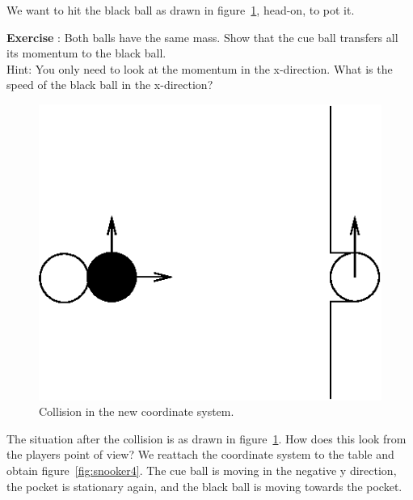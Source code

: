 \documentclass[12pt,a4paper]{article}
\numberwithin{equation}{section}
\numberwithin{figure}{section}
\newcounter{Exercise}
\numberwithin{table}{section}
\begin{document}
We want to hit the black ball as drawn in figure~\ref{fig:snooker3}, head-on, to pot it. 
\begin{shaded}
\textbf{Exercise \theExercise {}} : Both balls have the same mass. Show that the cue ball transfers all its momentum to the black ball.\\
Hint: You only need to look at the momentum in the x-direction. What is the speed of the black ball in the x-direction?
\end{shaded}

\begin{figure}\begin{center}
\includegraphics{snooker3.eps}%
\caption{Collision in the new coordinate system.}\label{fig:snooker3}
\end{center}\end{figure}

The situation after the collision is as drawn in figure~\ref{fig:snooker3}. How does this look from the players point of view? We reattach the coordinate system to the table and obtain figure~\ref{fig:snooker4}. The cue ball is moving in the negative y direction, the pocket is stationary again, and the black ball is moving towards the pocket. 
\end{document}
